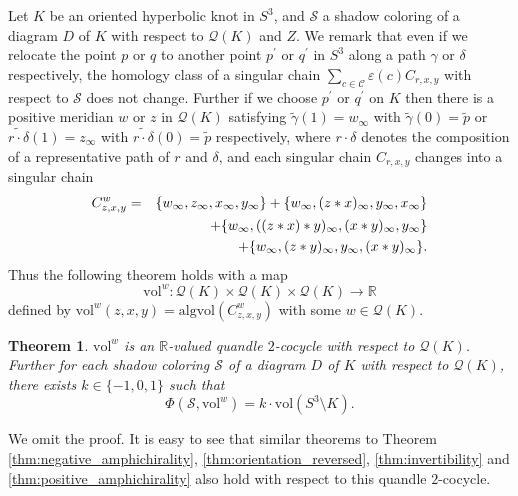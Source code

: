 \documentclass[12pt]{amsart}
\newtheorem{theorem}{Theorem}[section]
\theoremstyle{definition}
\begin{document}
Let $K$ be an oriented hyperbolic knot in $S^{3}$, and $\mathcal{S}$ a shadow coloring of a diagram $D$ of $K$ with respect to $\mathcal{Q}(K)$ and $Z$.
We remark that even if we relocate the point $p$ or $q$ to another point $p^{\prime}$ or $q^{\prime}$ in $S^{3}$ along a path $\gamma$ or $\delta$ respectively, the homology class of a singular chain $\displaystyle \sum_{c \in \mathcal{C}} \varepsilon(c) C_{r, x, y}$ with respect to $\mathcal{S}$ does not change.
Further if we choose $p^{\prime}$ or $q^{\prime}$ on $K$ then there is a positive meridian $w$ or $z$ in $\mathcal{Q}(K)$ satisfying $\widetilde{\gamma}(1) = w_{\infty}$ with $\widetilde{\gamma}(0) = \widetilde{p}$ or $\widetilde{r \cdot \delta}(1) = z_{\infty}$ with $\widetilde{r \cdot \delta}(0) = \widetilde{p}$ respectively, where $r \cdot \delta$ denotes the composition of a representative path of $r$ and $\delta$, and each singular chain $C_{r, x, y}$ changes into a singular chain
\begin{eqnarray*}
 C^{w}_{z, x, y} & = & \{ w_{\infty}, z_{\infty}, x_{\infty}, y_{\infty} \} + \{ w_{\infty}, (z \ast x)_{\infty}, y_{\infty}, x_{\infty} \} \\
 & & \hskip 1em + \{ w_{\infty}, ((z \ast x) \ast y)_{\infty}, (x \ast y)_{\infty}, y_{\infty} \} \\
 & & \hskip 2em + \{ w_{\infty}, (z \ast y)_{\infty}, y_{\infty}, (x \ast y)_{\infty} \}.
\end{eqnarray*}
Thus the following theorem holds with a map
\[
 \mathrm{vol}^{w} : \mathcal{Q}(K) \times \mathcal{Q}(K) \times \mathcal{Q}(K) \longrightarrow \mathbb{R}
\]
defined by $\mathrm{vol}^{w}(z, x, y) = \mathrm{algvol}(C^{w}_{z, x, y})$ with some $w \in \mathcal{Q}(K)$.

\begin{theorem}\label{thm:3_cocycle}
$\mathrm{vol}^{w}$ is an $\mathbb{R}$-valued quandle $2$-cocycle with respect to $\mathcal{Q}(K)$.
Further for each shadow coloring $\mathcal{S}$ of a diagram $D$ of $K$ with respect to $\mathcal{Q}(K)$, there exists $k \in \{ -1, 0, 1 \}$ such that
\[
 \Phi(\mathcal{S}, \mathrm{vol}^{w}) = k \cdot \mathrm{vol}(S^{3} \setminus K).
\]
\end{theorem}

\noindent
We omit the proof.
It is easy to see that similar theorems to Theorem \ref{thm:negative_amphichirality}, \ref{thm:orientation_reversed}, \ref{thm:invertibility} and \ref{thm:positive_amphichirality} also hold with respect to this quandle $2$-cocycle.
\end{document}
